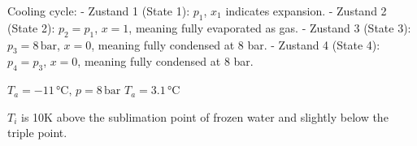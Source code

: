 Cooling cycle:  
- Zustand 1 (State 1): \( p_1 \), \( x_1 \) indicates expansion.  
- Zustand 2 (State 2): \( p_2 = p_1 \), \( x = 1 \), meaning fully evaporated as gas.  
- Zustand 3 (State 3): \( p_3 = 8 \, \text{bar} \), \( x = 0 \), meaning fully condensed at 8 bar.  
- Zustand 4 (State 4): \( p_4 = p_3 \), \( x = 0 \), meaning fully condensed at 8 bar.  

\( T_a = -11 \, \text{°C}, \, p = 8 \, \text{bar} \)  
\( T_a = 3.1 \, \text{°C} \)  

\( T_i \) is 10K above the sublimation point of frozen water and slightly below the triple point.